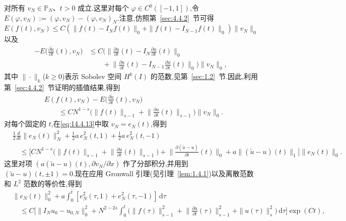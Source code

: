 对所有 \(v_N\in\mathbb P_N\)、\(t>0\) 成立.这里对每个 \(\varphi\in C^0([-1,1])\),令 \(E(\varphi,v_N):=(\varphi,v_N)-(\varphi,v_N)_N\).注意,仿照第~\ref{sec:4.4.2}~节可得
\[
  E(f(t),v_N)
     \le C(\|f(t)-I_Nf(t)\|_0+\|f(t)-I_{N-1}f(t)\|_0)\|v_N\|_0
\]
以及
\[
  \begin{aligned}
    -E\biggl(\frac{\partial\widetilde u}{\partial t}(t),v_N\biggr)
     &\le C\biggl(\biggl\|\frac{\partial u}{\partial t}(t)
                          -I_N\frac{\partial u}{\partial t}(t)\biggr\|_0\\
     &\qquad+\biggl\|\frac{\partial u}{\partial t}(t)
                          -I_{N-1}\frac{\partial u}{\partial t}(t)\biggr\|_0\biggr)\|v_N\|_0,
  \end{aligned}
\]
其中 \(\|\cdot\|_k\)(\(k\ge0\))表示 Sobolev 空间 \(H^k(I)\) 的范数,见第~\ref{sec:1.2}~节.因此,利用第~\ref{sec:4.4.2}~节证明的插值结果,得到
\begin{equation}\label{eq:14.4.14}
  \begin{aligned}
    &E(f(t),v_N)-E\biggl(\frac{\partial\widetilde u}{\partial t}(t),v_N\biggr)\\
    &\qquad\le CN^{1-s}\biggl(\|f(t)\|_{s-1}
                 +\biggl\|\frac{\partial u}{\partial t}(t)\biggr\|_{s-1}\biggr)\|v_N\|_0.
  \end{aligned}
\end{equation}
对每个固定的 \(t\),在\eqref{eq:14.4.13}中取 \(v_N=e_N(t)\),得到
\begin{equation}\label{eq:14.4.15}
  \begin{aligned}
    &\tfrac12\frac{d}{dt}\|e_N(t)\|_N^2
          +\tfrac12a\,e_N^2(t,1)+\tfrac12a\,e_N^2(t,-1)\\
    &\quad\le\biggl[CN^{1-s}\biggl(\|f(t)\|_{s-1}
                      +\biggl\|\frac{\partial u}{\partial t}(t)\biggr\|_{s-1}\biggr)
             +\biggl\|\frac{\partial(\widetilde u-u)}{\partial t}(t)\biggr\|_0
             +a\|(\widetilde u-u)(t)\|_1\biggr]\|e_N(t)\|_0.
  \end{aligned}
\end{equation}
这里对项 \((a(\widetilde u-u)(t),\partial v_N/\partial x)\) 作了分部积分,并用到 \((\widetilde u-u)(t,\pm1)=0\).现在应用 Gronwall 引理(见引理~\ref{lem:1.4.1})以及离散范数和 \(L^2\) 范数的等价性,得到
\begin{equation}\label{eq:14.4.16}
  \begin{aligned}
    &\|e_N(t)\|_0^2+a\int_0^t[e_N^2(\tau,1)+e_N^2(\tau,-1)]\,\mathrm d\tau\\
    &\quad\le C\biggl[\|I_Nu_0-u_{0,N}\|_0^2+N^{2-2s}\int_0^t
          \biggl(\|f(\tau)\|_{s-1}^2
             +\biggl\|\frac{\partial u}{\partial t}(\tau)\biggr\|_{s-1}^2
             +\|u(\tau)\|_s^2\biggr)\,\mathrm d\tau\biggr]\exp(Ct),
  \end{aligned}
\end{equation}
